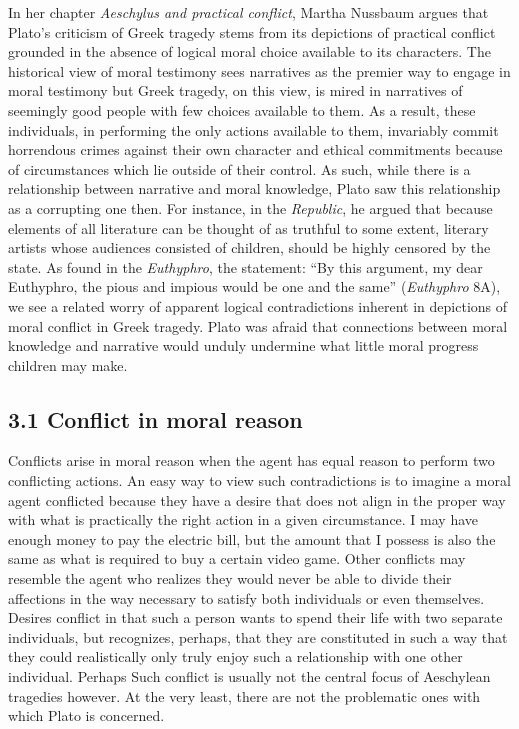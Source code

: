 \documentclass[
  12pt,
]{book}
\theoremstyle{definition}
\theoremstyle{definition}
\theoremstyle{definition}
\theoremstyle{definition}
\theoremstyle{remark}
\begin{document}
In her chapter \emph{Aeschylus and practical conflict}, Martha Nussbaum argues that Plato's criticism of Greek tragedy stems from its depictions of practical conflict grounded in the absence of logical moral choice available to its characters. The historical view of moral testimony sees narratives as the premier way to engage in moral testimony but Greek tragedy, on this view, is mired in narratives of seemingly good people with few choices available to them. As a result, these individuals, in performing the only actions available to them, invariably commit horrendous crimes against their own character and ethical commitments because of circumstances which lie outside of their control. As such, while there is a relationship between narrative and moral knowledge, Plato saw this relationship as a corrupting one then. For instance, in the \emph{Republic}, he argued that because elements of all literature can be thought of as truthful to some extent, literary artists whose audiences consisted of children, should be highly censored by the state. As found in the \emph{Euthyphro}, the statement: ``By this argument, my dear Euthyphro, the pious and impious would be one and the same'' (\emph{Euthyphro} 8A), we see a related worry of apparent logical contradictions inherent in depictions of moral conflict in Greek tragedy. Plato was afraid that connections between moral knowledge and narrative would unduly undermine what little moral progress children may make.

\subsection*{3.1 Conflict in moral reason}\label{conflict-in-moral-reason}

Conflicts arise in moral reason when the agent has equal reason to perform two conflicting actions. An easy way to view such contradictions is to imagine a moral agent conflicted because they have a desire that does not align in the proper way with what is practically the right action in a given circumstance. I may have enough money to pay the electric bill, but the amount that I possess is also the same as what is required to buy a certain video game. Other conflicts may resemble the agent who realizes they would never be able to divide their affections in the way necessary to satisfy both individuals or even themselves. Desires conflict in that such a person wants to spend their life with two separate individuals, but recognizes, perhaps, that they are constituted in such a way that they could realistically only truly enjoy such a relationship with one other individual. Perhaps Such conflict is usually not the central focus of Aeschylean tragedies however. At the very least, there are not the problematic ones with which Plato is concerned.
\end{document}
